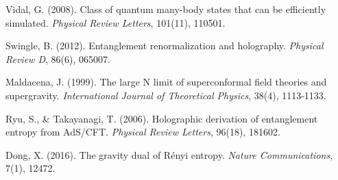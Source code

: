 \documentclass[12pt,a4paper]{article}
\begin{document}
\begin{thebibliography}{99}
 Vidal, G. (2008). Class of quantum many-body states that can be efficiently simulated. \textit{Physical Review Letters}, 101(11), 110501.

 Swingle, B. (2012). Entanglement renormalization and holography. \textit{Physical Review D}, 86(6), 065007.

 Maldacena, J. (1999). The large N limit of superconformal field theories and supergravity. \textit{International Journal of Theoretical Physics}, 38(4), 1113-1133.

 Ryu, S., \& Takayanagi, T. (2006). Holographic derivation of entanglement entropy from AdS/CFT. \textit{Physical Review Letters}, 96(18), 181602.

 Dong, X. (2016). The gravity dual of Rényi entropy. \textit{Nature Communications}, 7(1), 12472.

\end{thebibliography}
\end{document}
